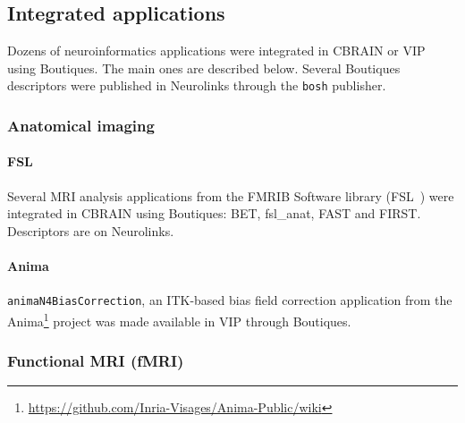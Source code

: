 \documentclass[a4paper,num-refs]{oup-contemporary}
\newcommand{\todo}[1]{\color{red}TODO: #1\color{black}}
\newcommand{\boutiques}{Boutiques\xspace}
\begin{document}
\subsection{Integrated applications}



Dozens of neuroinformatics applications were integrated in CBRAIN or
VIP using \boutiques. The main ones are described below. Several
\boutiques descriptors were published in Neurolinks through the
\texttt{bosh} publisher.




\subsubsection{Anatomical imaging}

\paragraph{FSL} Several MRI analysis applications from the FMRIB Software
library (FSL~\cite{jenkinson2012fsl}) were integrated in CBRAIN using
\boutiques: BET, fsl\_anat, FAST and FIRST. Descriptors are
on Neurolinks.

\paragraph{Anima}
\texttt{animaN4BiasCorrection}, an ITK-based bias field correction application from the
Anima\footnote{\url{https://github.com/Inria-Visages/Anima-Public/wiki}}
project was made available in VIP through \boutiques. 

\subsubsection{Functional MRI (fMRI)}
\end{document}
